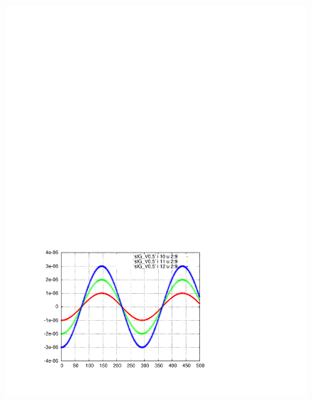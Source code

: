 \documentclass[]{article}
\begin{document}
\begin{figure}[h]
\begin{minipage}[b]{0.45\linewidth}
\includegraphics[scale=0.55]{pdf/delta_vs_turn_V0p5.pdf}
\end{minipage}
%
%
\begin{minipage}[b]{0.45\linewidth}
\centering

\end{minipage}
\end{figure}
\end{document}
